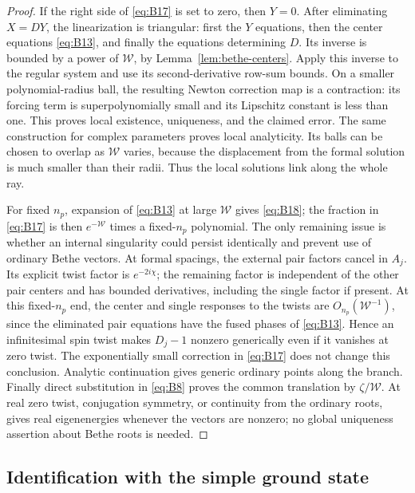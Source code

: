 \begin{proof}
If the right side of \eqref{eq:B17} is set to zero, then $Y=0$.
After eliminating $X=DY$, the linearization is triangular: first the
$Y$ equations, then the center equations \eqref{eq:B13}, and finally
the equations determining $D$.  Its inverse is bounded by a power of
$\mathcal W$, by Lemma~\ref{lem:bethe-centers}.  Apply this inverse to
the regular system and use its second-derivative row-sum bounds.  On
a smaller polynomial-radius ball, the resulting Newton correction map
is a contraction: its forcing term is superpolynomially small and its
Lipschitz constant is less than one.  This proves local existence,
uniqueness, and the claimed error.  The same construction for complex
parameters proves local analyticity.  Its balls can be chosen to
overlap as $\mathcal W$ varies, because the displacement from the
formal solution is much smaller than their radii.  Thus the local
solutions link along the whole ray.

For fixed $n_p$, expansion of \eqref{eq:B13} at large $\mathcal W$
gives \eqref{eq:B18}; the fraction in \eqref{eq:B17} is then
$e^{-\mathcal W}$ times a fixed-$n_p$ polynomial.  The only remaining
issue is whether an internal singularity could persist identically
and prevent use of ordinary Bethe vectors.  At formal spacings,
the external pair factors cancel in $A_j$.  Its explicit twist factor
is $e^{-2i\chi}$; the remaining factor is independent of the other
pair centers and has bounded derivatives, including the single factor
if present.  At this fixed-$n_p$ end, the center and single responses
to the twists are $O_{n_p}(\mathcal W^{-1})$, since the eliminated pair
equations have the fused phases of \eqref{eq:B13}.  Hence an infinitesimal
spin twist makes $D_j-1$ nonzero generically even if it vanishes at zero
twist.  The exponentially small correction in \eqref{eq:B17} does not
change this conclusion.  Analytic continuation gives generic ordinary
points along the branch.  Finally direct substitution in
\eqref{eq:B8} proves the common translation by $\zeta/\mathcal W$.
At real zero twist, conjugation symmetry, or continuity from the
ordinary roots, gives real eigenenergies whenever the vectors are
nonzero; no global uniqueness assertion about Bethe roots is needed.
\end{proof}

\subsection{Identification with the simple ground state}

